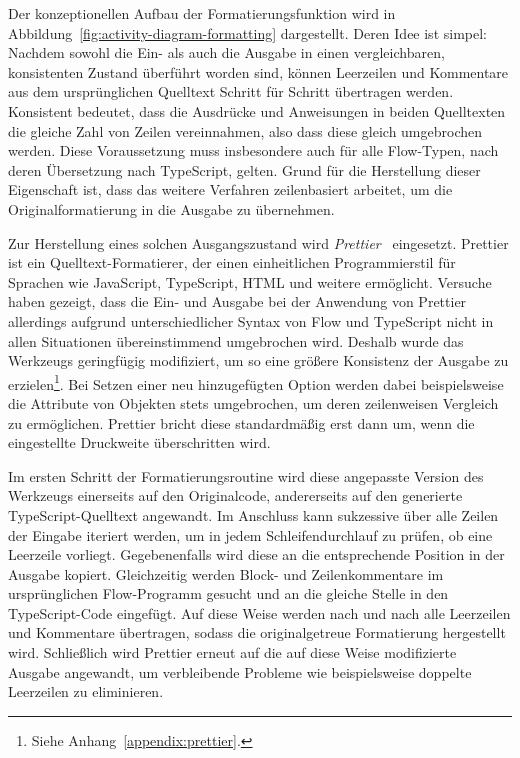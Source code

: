 Der konzeptionellen Aufbau der Formatierungsfunktion wird in Abbildung~\ref{fig:activity-diagram-formatting} dargestellt. Deren Idee ist simpel: Nachdem sowohl die Ein- als auch die Ausgabe in einen vergleichbaren, konsistenten Zustand überführt worden sind, können Leerzeilen und Kommentare aus dem ursprünglichen Quelltext Schritt für Schritt übertragen werden. Konsistent bedeutet, dass die Ausdrücke und Anweisungen in beiden Quelltexten die gleiche Zahl von Zeilen vereinnahmen, also dass diese gleich umgebrochen werden. Diese Voraussetzung muss insbesondere auch für alle Flow-Typen, nach deren Übersetzung nach TypeScript, gelten. Grund für die Herstellung dieser Eigenschaft ist, dass das weitere Verfahren zeilenbasiert arbeitet, um die Originalformatierung in die Ausgabe zu übernehmen.

Zur Herstellung eines solchen Ausgangszustand wird \textit{Prettier}~\autocite{SOFTWARE:PRETTIER} eingesetzt. Prettier ist ein Quelltext-Formatierer, der einen einheitlichen Programmierstil für Sprachen wie JavaScript, TypeScript, HTML und weitere ermöglicht. Versuche haben gezeigt, dass die Ein- und Ausgabe bei der Anwendung von Prettier allerdings aufgrund unterschiedlicher Syntax von Flow und TypeScript nicht in allen Situationen übereinstimmend umgebrochen wird. Deshalb wurde das Werkzeugs geringfügig modifiziert, um so eine größere Konsistenz der Ausgabe zu erzielen\footnote{Siehe Anhang~\ref{appendix:prettier}.}. Bei Setzen einer neu hinzugefügten Option werden dabei beispielsweise die Attribute von Objekten stets umgebrochen, um deren zeilenweisen Vergleich zu ermöglichen. Prettier bricht diese standardmäßig erst dann um, wenn die eingestellte Druckweite überschritten wird.

Im ersten Schritt der Formatierungsroutine wird diese angepasste Version des Werkzeugs einerseits auf den Originalcode, andererseits auf den generierte TypeScript-Quelltext angewandt. Im Anschluss kann sukzessive über alle Zeilen der Eingabe iteriert werden, um in jedem Schleifendurchlauf zu prüfen, ob eine Leerzeile vorliegt. Gegebenenfalls wird diese an die entsprechende Position in der Ausgabe kopiert. Gleichzeitig werden Block- und Zeilenkommentare im ursprünglichen Flow-Programm gesucht und an die gleiche Stelle in den TypeScript-Code eingefügt. Auf diese Weise werden nach und nach alle Leerzeilen und Kommentare übertragen, sodass die originalgetreue Formatierung hergestellt wird. Schließlich wird Prettier erneut auf die auf diese Weise modifizierte Ausgabe angewandt, um verbleibende Probleme wie beispielsweise doppelte Leerzeilen zu eliminieren.
